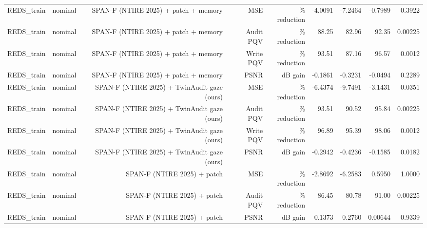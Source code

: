 \begin{table}[t]
\begin{tabular}{llrrrrrrr}
REDS\_train & nominal & SPAN-F (NTIRE 2025) + patch + memory & MSE & \% reduction & -4.0091 & -7.2464 & -0.7989 & 0.3922 \\
REDS\_train & nominal & SPAN-F (NTIRE 2025) + patch + memory & Audit PQV & \% reduction & 88.25 & 82.96 & 92.35 & 0.00225 \\
REDS\_train & nominal & SPAN-F (NTIRE 2025) + patch + memory & Write PQV & \% reduction & 93.51 & 87.16 & 96.57 & 0.0012 \\
REDS\_train & nominal & SPAN-F (NTIRE 2025) + patch + memory & PSNR & dB gain & -0.1861 & -0.3231 & -0.0494 & 0.2289 \\
REDS\_train & nominal & SPAN-F (NTIRE 2025) + TwinAudit gaze (ours) & MSE & \% reduction & -6.4374 & -9.7491 & -3.1431 & 0.0351 \\
REDS\_train & nominal & SPAN-F (NTIRE 2025) + TwinAudit gaze (ours) & Audit PQV & \% reduction & 93.51 & 90.52 & 95.84 & 0.00225 \\
REDS\_train & nominal & SPAN-F (NTIRE 2025) + TwinAudit gaze (ours) & Write PQV & \% reduction & 96.89 & 95.39 & 98.06 & 0.0012 \\
REDS\_train & nominal & SPAN-F (NTIRE 2025) + TwinAudit gaze (ours) & PSNR & dB gain & -0.2942 & -0.4236 & -0.1585 & 0.0182 \\
REDS\_train & nominal & SPAN-F (NTIRE 2025) + patch & MSE & \% reduction & -2.8692 & -6.2583 & 0.5950 & 1.0000 \\
REDS\_train & nominal & SPAN-F (NTIRE 2025) + patch & Audit PQV & \% reduction & 86.45 & 80.78 & 91.00 & 0.00225 \\
REDS\_train & nominal & SPAN-F (NTIRE 2025) + patch & PSNR & dB gain & -0.1373 & -0.2760 & 0.00644 & 0.9339 \\
\bottomrule
\end{tabular}
\end{table}
